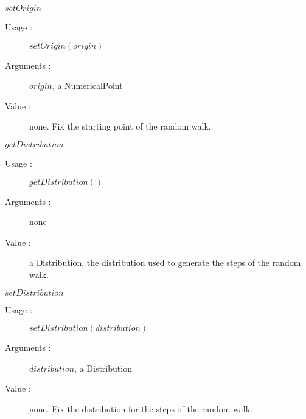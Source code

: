 \begin{description}
\begin{description}
  \item $setOrigin$
    \begin{description}
    \item[Usage :] $setOrigin(origin)$
    \item[Arguments :] $origin$, a NumericalPoint
    \item[Value :] none. Fix the starting point of the random walk.
    \end{description}
    \bigskip

  \end{description}

  \begin{description}

  \item $getDistribution$
    \begin{description}
    \item[Usage :] $getDistribution()$
    \item[Arguments :] none
    \item[Value :] a Distribution, the distribution used to generate the steps of the random walk.
    \end{description}
    \bigskip

  \item $setDistribution$
    \begin{description}
    \item[Usage :] $setDistribution(distribution)$
    \item[Arguments :] $distribution$, a Distribution
    \item[Value :] none. Fix the distribution for the steps of the random walk.
    \end{description}
    \bigskip

  \end{description}

\end{description}



